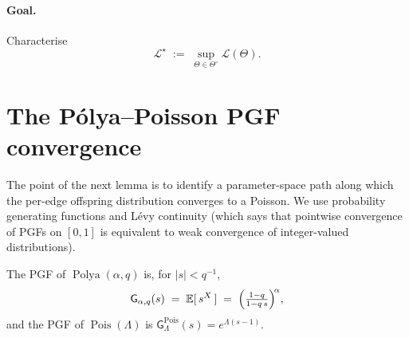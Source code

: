 \documentclass[11pt]{article}
\newcommand{\E}{\mathbb{E}}
\newcommand{\Ll}{\mathcal{L}}
\newcommand{\PGF}{\mathsf{G}}
\DeclareMathOperator{\Pol}{Polya}
\DeclareMathOperator{\Poi}{Pois}
\theoremstyle{definition}
\begin{document}
\paragraph{Goal.}
Characterise
\begin{equation}
\Ll^\star \;:=\; \sup_{\Theta\in\Theta^\circ}\Ll(\Theta).
\label{eq:supgoal}
\end{equation}

\section{The Pólya--Poisson PGF convergence}
\label{sec:pgf}

The point of the next lemma is to identify a parameter-space path
along which the per-edge offspring distribution converges to a
Poisson. We use probability generating functions and L\'evy
continuity (which says that pointwise convergence of PGFs on $[0,1]$
is equivalent to weak convergence of integer-valued distributions).

The PGF of $\Pol(\alpha, q)$ is, for $|s| < q^{-1}$,
\begin{equation}
\PGF_{\alpha, q}(s) \;=\; \E[\,s^X\,]
\;=\;
\Bigl(\tfrac{1-q}{1 - q\,s}\Bigr)^{\!\alpha},
\label{eq:polya-pgf}
\end{equation}
and the PGF of $\Poi(\Lambda)$ is
$\PGF^{\mathrm{Pois}}_\Lambda(s) = e^{\Lambda(s-1)}$.
\end{document}
